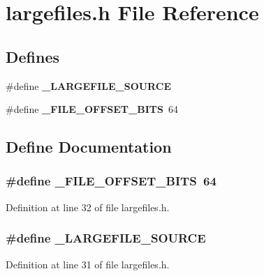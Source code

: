 \section{largefiles.h File Reference}
\label{largefiles_8h}
\subsection*{Defines}
\begin{CompactItemize}
\item 
\#define {\bf \_\-LARGEFILE\_\-SOURCE}
\item 
\#define {\bf \_\-FILE\_\-OFFSET\_\-BITS}\ 64
\end{CompactItemize}


\subsection{Define Documentation}
\subsubsection{\setlength{\rightskip}{0pt plus 5cm}\#define \_\-FILE\_\-OFFSET\_\-BITS\ 64}\label{largefiles_8h_a1}




Definition at line 32 of file largefiles.h.
\subsubsection{\setlength{\rightskip}{0pt plus 5cm}\#define \_\-LARGEFILE\_\-SOURCE}\label{largefiles_8h_a0}




Definition at line 31 of file largefiles.h.